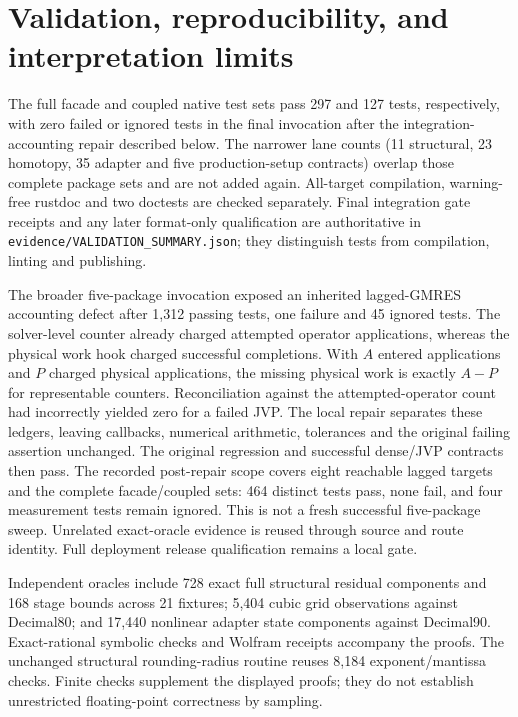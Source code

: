 \documentclass[aps,pra,reprint,onecolumn,12pt,notitlepage,superscriptaddress,nofootinbib]{revtex4-2}
\begin{document}
\section{Validation, reproducibility, and interpretation limits}
The full facade and coupled native test sets pass 297 and 127 tests,
respectively, with zero failed or ignored tests in the final invocation
after the integration-accounting repair described below.
The narrower lane counts (11 structural, 23 homotopy, 35 adapter and five
production-setup contracts) overlap those complete package sets and are
not added again. All-target compilation, warning-free rustdoc and two
doctests are checked separately. Final integration gate receipts and any
later format-only qualification are authoritative in
\texttt{evidence/VALIDATION\_SUMMARY.json}; they distinguish tests from
compilation, linting and publishing.

The broader five-package invocation exposed an inherited lagged-GMRES
accounting defect after 1,312 passing tests, one failure and 45 ignored tests.
The solver-level counter already charged attempted operator applications,
whereas the physical work hook charged successful completions. With $A$
entered applications and $P$ charged physical applications, the missing
physical work is exactly $A-P$ for representable counters. Reconciliation
against the attempted-operator count had incorrectly yielded zero for a
failed JVP. The local repair separates these ledgers, leaving callbacks,
numerical arithmetic, tolerances and the original failing assertion unchanged.
The original regression and successful dense/JVP contracts then pass.
The recorded post-repair scope covers eight reachable lagged targets and
the complete facade/coupled sets: 464 distinct tests pass, none fail,
and four measurement tests remain ignored. This is not a fresh successful five-package
sweep. Unrelated exact-oracle evidence is reused through source and route
identity. Full deployment release qualification remains a local gate.

Independent oracles include 728 exact full structural residual components
and 168 stage bounds across 21 fixtures; 5,404 cubic grid observations
against Decimal80; and 17,440 nonlinear adapter state components against
Decimal90. Exact-rational symbolic checks and Wolfram receipts accompany
the proofs. The unchanged structural rounding-radius routine reuses 8,184
exponent/mantissa checks. Finite checks supplement the displayed proofs;
they do not establish unrestricted floating-point correctness by sampling.
\end{document}

